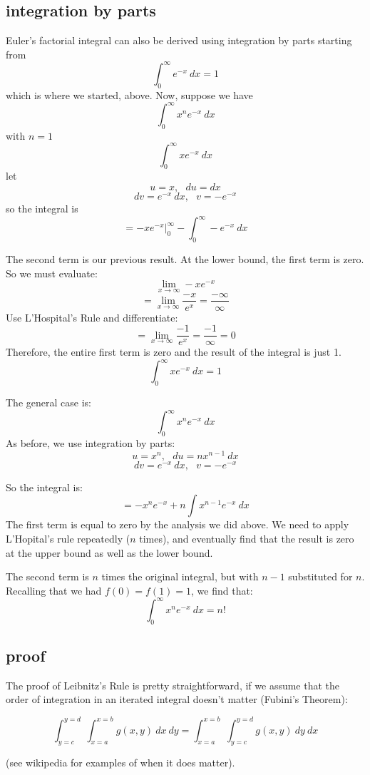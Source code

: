 \documentclass[11pt, oneside]{article}
\begin{document}
\subsection*{integration by parts}

Euler's factorial integral can also be derived using integration by parts starting from 
\[ \int_0^{\infty} e^{-x} \ dx  = 1 \]
which is where we started, above.  Now, suppose we have
\[ \int_0^{\infty} x^n e^{-x} \ dx  \]
with $n=1$
\[ \int_0^{\infty} x e^{-x} \ dx  \]
let 
\[ u = x, \ \ \ du = dx \]
\[ dv = e^{-x} \ dx, \ \ \ v = -e^{-x} \]
so the integral is
\[ = - x e^{-x} \bigg |_0^{\infty} - \int_0^{\infty} -e^{-x} \ dx \]

The second term is our previous result.  At the lower bound, the first term is zero.  So we must evaluate:
\[ \lim_{x \rightarrow \infty} -x e^{-x} \]
\[ = \lim_{x \rightarrow \infty} \frac{-x}{e^{x}} = \frac{- \infty}{\infty} \]
Use L'Hospital's Rule and differentiate:
\[ = \lim_{x \rightarrow \infty} \frac{-1}{e^{x}} = \frac{-1}{\infty} = 0 \]
Therefore, the entire first term is zero and the result of the integral is just 1.
\[ \int_0^{\infty} x e^{-x} \ dx  = 1 \]

The general case is:
\[ \int_0^{\infty} x^n e^{-x} \ dx \]
As before, we use integration by parts:
\[ u = x^n, \ \ \ du = n x^{n-1} \ dx \]
\[ dv =  e^{-x} \ dx, \ \ \ v = -e^{-x} \]
    
So the integral is:
\[ = -x^n e^{-x} + n \int x^{n-1} e^{-x} \ dx \]
The first term is equal to zero by the analysis we did above.  We need to apply L'Hopital's rule repeatedly ($n$ times), and eventually find that the result is zero at the upper bound as well as the lower bound.

The second term is $n$ times the original integral, but with $n-1$ substituted for $n$.  Recalling that we had $f(0) = f(1) = 1$, we find that:
\[ \int_0^{\infty} x^n e^{-x} \ dx = n! \]

\subsection*{proof}
The proof of Leibnitz's Rule is pretty straightforward, if we assume that the order of integration in an iterated integral doesn't matter (Fubini's Theorem):

\[ \int_{y=c}^{y=d} \ \int_{x=a}^{x=b} g(x,y) \ dx \ dy = \int_{x=a}^{x=b} \  \int_{y=c}^{y=d}  g(x,y) \ dy \ dx \]

(see wikipedia for examples of when it does matter).
\end{document}
